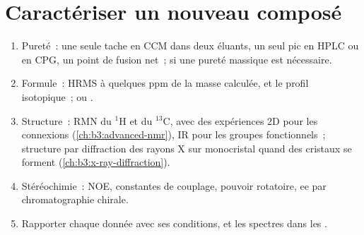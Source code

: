 \section{Caractériser un nouveau composé}

\begin{method}\label{met:b3:lab-techniques-3:characterise}
\begin{enumerate}
  \item Pureté~: une seule tache en CCM dans deux éluants, un seul pic en
        HPLC ou en CPG, un point de fusion net~;  si une
        pureté massique est nécessaire.
  \item Formule~: HRMS à quelques ppm de la masse calculée, et le profil
        isotopique~; ou .
  \item Structure~: RMN du $^1$H et du $^{13}$C, avec des expériences 2D pour les connexions
        (\cref{ch:b3:advanced-nmr}), IR pour les groupes fonctionnels~;
        structure par diffraction des rayons X sur monocristal quand des
        cristaux se forment (\cref{ch:b3:x-ray-diffraction}).
  \item Stéréochimie~: NOE, constantes de couplage, pouvoir rotatoire, ee
        par chromatographie chirale.
  \item Rapporter chaque donnée avec ses conditions, et les spectres dans
        les .
\end{enumerate}
\end{method}

